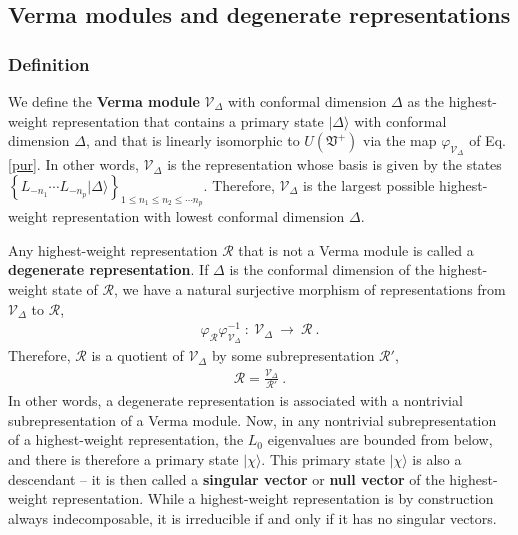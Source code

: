 \documentclass[12pt, a4paper, notitlepage, twoside]{report}
\numberwithin{equation}{section}
\theoremstyle{break}
\begin{document}
\subsection{Verma modules and degenerate representations \label{secvm}}

\subsubsection{Definition}

We define the \textbf{\boldmath Verma module} $\mathcal{V}_\Delta$ with conformal dimension $\Delta$ as the highest-weight representation that contains a primary state $|\Delta\rangle$ with conformal dimension $\Delta$, and that is linearly isomorphic to $U(\mathfrak{V}^+)$ via the map $\varphi_{\mathcal{V}_\Delta}$ of Eq. \eqref{pur}.
In other words, $\mathcal{V}_\Delta$ is the representation whose basis is given by the states  $\left\{ L_{-n_1} \cdots L_{-n_p}|\Delta\rangle\right\}_{1\leq n_1\leq n_2\leq \cdots n_p}$.
Therefore, $\mathcal{V}_\Delta$ is the largest possible highest-weight representation with lowest conformal dimension $\Delta$. 

Any  highest-weight representation $\mathcal{R}$ that is not a Verma module is called a \textbf{\boldmath degenerate representation}.
If $\Delta$ is the conformal dimension of the highest-weight state of $\mathcal{R}$, we have a natural surjective morphism of representations from $\mathcal{V}_\Delta$ to $\mathcal{R}$,
\begin{align}
\varphi_\mathcal{R} \varphi_{\mathcal{V}_\Delta}^{-1}\ : \  \mathcal{V}_\Delta\ \rightarrow\ \mathcal{R} \ .
\end{align}
Therefore, $\mathcal{R}$ is a quotient of $\mathcal{V}_\Delta$ by some subrepresentation $\mathcal{R}'$,
\begin{align}
 \mathcal{R} = \frac{\mathcal{V}_\Delta}{\mathcal{R}'}\ .
\label{rvrp}
\end{align}
In other words, a degenerate representation is associated with a nontrivial subrepresentation of a Verma module.
Now, in any nontrivial subrepresentation of a highest-weight representation, the $L_0$ eigenvalues are bounded from below, and there is therefore a primary state $|\chi\rangle$.
This primary state $|\chi\rangle$ is also a descendant -- it is then called a \textbf{\boldmath singular vector} or \textbf{\boldmath null vector} of the highest-weight representation.
While a highest-weight representation is by construction always indecomposable, it is irreducible if and only if it has no singular vectors.
\end{document}
